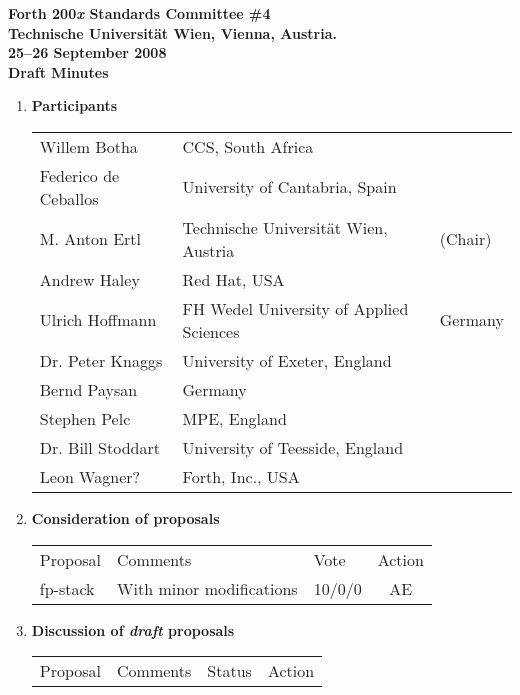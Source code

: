 \documentclass{article}
\begin{document}
\pagestyle{empty}

\begin{center}\bf\large
Forth 200\emph{x} Standards Committee \#4 \\[6pt]
Technische Universit\"{a}t Wien, Vienna, Austria. \\[6pt]
25--26 September 2008 \\[12pt]
Draft Minutes
\end{center}

\begin{enumerate}[1. ]

\item \textbf{Participants}

	\begin{tabular}{lll}
		Willem		Botha		& CCS, South Africa \\
		Federico de	Ceballos	& University of Cantabria, Spain \\
		M. Anton	Ertl		& Technische Universit\"{a}t Wien, Austria & (Chair) \\
		Andrew		Haley		& Red Hat, USA \\
		Ulrich		Hoffmann	& FH Wedel University of Applied Sciences & Germany	\\
		Dr. Peter	Knaggs		& University of Exeter, England \\
		Bernd		Paysan		& Germany \\
		Stephen		Pelc		& MPE, England \\
		Dr. Bill	Stoddart	& University of Teesside, England \\
		Leon		Wagner?		& Forth, Inc., USA \\
	\end{tabular}


\item \textbf{Consideration of proposals}
\label{CfV}

\begin{tabular}{p{6.5em}p{24em}lc}
	Proposal	& Comments				& Vote & Action \\

\textsf{fp-stack}
	& With minor modifications
	& 10/0/0
	& AE \\
\end{tabular}


\item \textbf{Discussion of \emph{draft} proposals}
\label{RfD}

\begin{tabular}{p{6.5em}p{22.5em}lc}
	Proposal & Comments & Status & Action \\


\end{tabular}
\end{enumerate}
\end{document}
